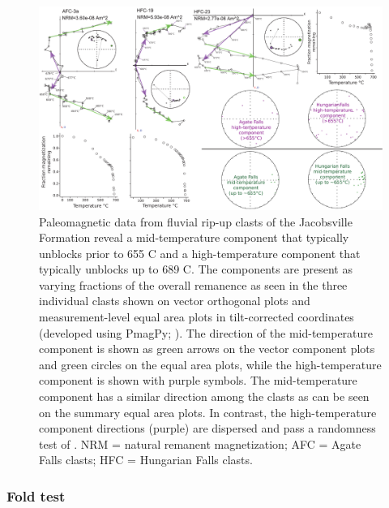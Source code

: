 \documentclass[draft]{agujournal2019}
\begin{document}
\begin{figure}[h!]
\centering
\includegraphics[width=\textwidth]{Intraclast_pmag.pdf}
\caption{Paleomagnetic data from fluvial rip-up clasts of the Jacobsville Formation reveal a mid-temperature component that typically unblocks prior to 655 \textdegree C and a high-temperature component that typically unblocks up to 689 \textdegree C. The components are present as varying fractions of the overall remanence as seen in the three individual clasts shown on vector orthogonal plots and measurement-level equal area plots in tilt-corrected coordinates (developed using PmagPy; ). The direction of the mid-temperature component is shown as green arrows on the vector component plots and green circles on the equal area plots, while the high-temperature component is shown with purple symbols. The mid-temperature component has a similar direction among the clasts as can be seen on the summary equal area plots. In contrast, the high-temperature component directions (purple) are dispersed and pass a randomness test of . NRM = natural remanent magnetization; AFC = Agate Falls clasts; HFC = Hungarian Falls clasts.}
\label{fig:Intraclast_pmag}
\end{figure}

\subsubsection*{Fold test}
\end{document}
